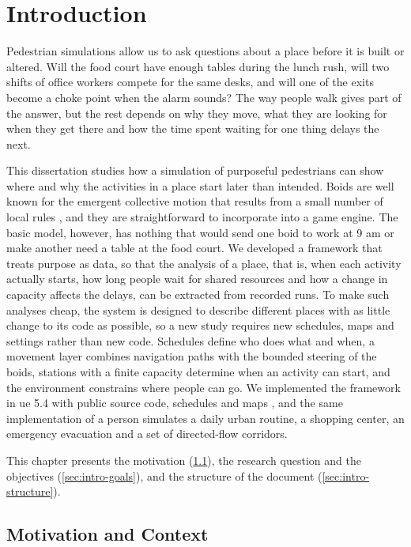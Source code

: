 \chapter{Introduction}\label{chap:intro}

Pedestrian simulations allow us to ask questions about a place before it is built or altered. Will the food court have enough tables during the lunch rush, will two shifts of office workers compete for the same desks, and will one of the exits become a choke point when the alarm sounds? The way people walk gives part of the answer, but the rest depends on why they move, what they are looking for when they get there and how the time spent waiting for one thing delays the next.

This dissertation studies how a simulation of purposeful pedestrians can show where and why the activities in a place start later than intended. Boids are well known for the emergent collective motion that results from a small number of local rules \citep{reynolds1987flocks}, and they are straightforward to incorporate into a game engine. The basic model, however, has nothing that would send one boid to work at 9 am or make another need a table at the food court. We developed a framework that treats purpose as data, so that the analysis of a place, that is, when each activity actually starts, how long people wait for shared resources and how a change in capacity affects the delays, can be extracted from recorded runs. To make such analyses cheap, the system is designed to describe different places with as little change to its code as possible, so a new study requires new schedules, maps and settings rather than new code. Schedules define who does what and when, a movement layer combines navigation paths with the bounded steering of the boids, stations with a finite capacity determine when an activity can start, and the environment constrains where people can go. We implemented the framework in \gls{ue} 5.4 with public source code, schedules and maps \citep{armada2026repository}, and the same implementation of a person simulates a daily urban routine, a shopping center, an emergency evacuation and a set of directed-flow corridors.

This chapter presents the motivation (\cref{sec:intro-motivation}), the research question and the objectives (\cref{sec:intro-goals}), and the structure of the document (\cref{sec:intro-structure}).

\section{Motivation and Context}\label{sec:intro-motivation}

